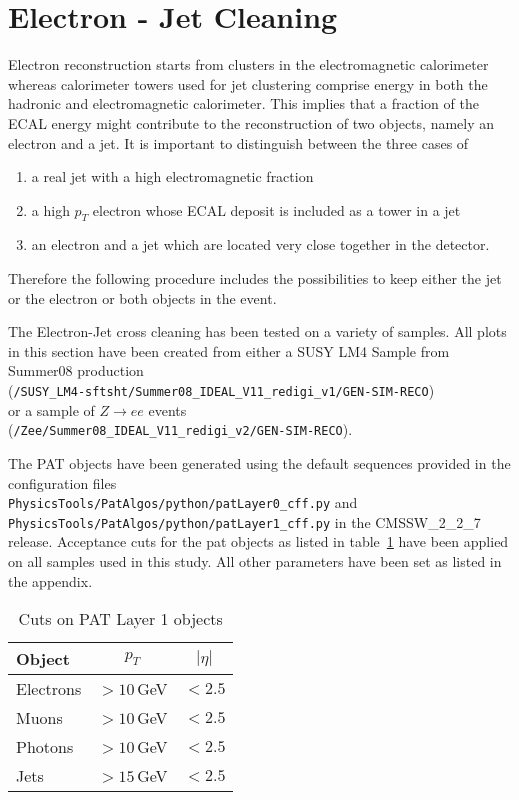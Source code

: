 \documentclass{cmspaper}
\begin{document}
\section{Electron - Jet Cleaning}
\label{sec:ElecJet}
Electron reconstruction starts from clusters in the electromagnetic calorimeter
whereas calorimeter towers used for jet clustering comprise energy in both the
hadronic and electromagnetic calorimeter. This implies that a fraction of the
ECAL energy might contribute to the reconstruction of two objects, namely an
electron and a jet. It is important to distinguish between the three cases of
\begin{enumerate}
\item a real jet with a high electromagnetic fraction
\item a high $p_T$ electron whose ECAL deposit is included as a tower in a jet
\item an electron and a jet which are located very close together in the
    detector.
\end{enumerate}
Therefore the following procedure includes the possibilities to keep either the
jet or the electron or both objects in the event.

The Electron-Jet cross cleaning has been tested on a variety of samples. All
plots in this section have been created from either a SUSY LM4 Sample from
Summer08 production\\
(\texttt{/SUSY\_LM4-sftsht/Summer08\_IDEAL\_V11\_redigi\_v1/GEN-SIM-RECO})\\
or a sample of
$Z\rightarrow ee$ events \\(\texttt{/Zee/Summer08\_IDEAL\_V11\_redigi\_v2/GEN-SIM-RECO}).

The PAT objects have been generated using the default sequences provided in the
configuration files\\
\texttt{PhysicsTools/PatAlgos/python/patLayer0\_cff.py} and\\
\texttt{PhysicsTools/PatAlgos/python/patLayer1\_cff.py} in the CMSSW\_2\_2\_7
release. Acceptance cuts for the pat objects as listed in
table~\ref{tab:PATobjCuts} have been applied on all samples used in this study.
All other parameters have been set as listed in the appendix.

\begin{table}[h]
\caption{Cuts on PAT Layer 1 objects}
\begin{center}
\begin{tabular}{l|c|c}
\textbf{Object} & \textbf{$p_T$} & \textbf{$|\eta|$} \\ \hline
    Electrons & $>10$\,GeV & $<2.5$  \\\hline
    Muons     & $>10$\,GeV & $<2.5$  \\\hline
    Photons   & $>10$\,GeV & $<2.5$  \\\hline
    Jets      & $>15$\,GeV & $<2.5$
\end{tabular}
\end{center}
\label{tab:PATobjCuts}
\end{table}
\end{document}
